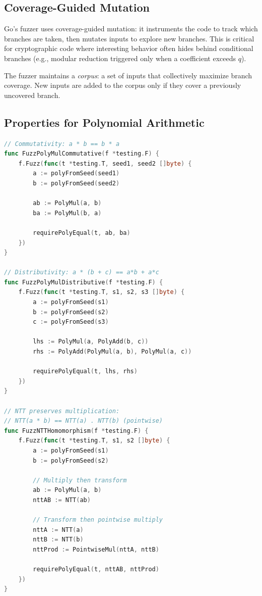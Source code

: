 \documentclass[11pt,a4paper]{article}
\begin{document}
\subsection{Coverage-Guided Mutation}

Go's fuzzer uses coverage-guided mutation: it instruments the code to track which
branches are taken, then mutates inputs to explore new branches. This is critical for
cryptographic code where interesting behavior often hides behind conditional branches
(e.g., modular reduction triggered only when a coefficient exceeds $q$).

The fuzzer maintains a \emph{corpus}: a set of inputs that collectively maximize branch
coverage. New inputs are added to the corpus only if they cover a previously uncovered
branch.

\subsection{Properties for Polynomial Arithmetic}

\begin{lstlisting}[language=Go,caption={Property-based fuzz tests for polynomial arithmetic}]
// Commutativity: a * b == b * a
func FuzzPolyMulCommutative(f *testing.F) {
    f.Fuzz(func(t *testing.T, seed1, seed2 []byte) {
        a := polyFromSeed(seed1)
        b := polyFromSeed(seed2)

        ab := PolyMul(a, b)
        ba := PolyMul(b, a)

        requirePolyEqual(t, ab, ba)
    })
}

// Distributivity: a * (b + c) == a*b + a*c
func FuzzPolyMulDistributive(f *testing.F) {
    f.Fuzz(func(t *testing.T, s1, s2, s3 []byte) {
        a := polyFromSeed(s1)
        b := polyFromSeed(s2)
        c := polyFromSeed(s3)

        lhs := PolyMul(a, PolyAdd(b, c))
        rhs := PolyAdd(PolyMul(a, b), PolyMul(a, c))

        requirePolyEqual(t, lhs, rhs)
    })
}

// NTT preserves multiplication:
// NTT(a * b) == NTT(a) . NTT(b) (pointwise)
func FuzzNTTHomomorphism(f *testing.F) {
    f.Fuzz(func(t *testing.T, s1, s2 []byte) {
        a := polyFromSeed(s1)
        b := polyFromSeed(s2)

        // Multiply then transform
        ab := PolyMul(a, b)
        nttAB := NTT(ab)

        // Transform then pointwise multiply
        nttA := NTT(a)
        nttB := NTT(b)
        nttProd := PointwiseMul(nttA, nttB)

        requirePolyEqual(t, nttAB, nttProd)
    })
}
\end{lstlisting}
\end{document}
